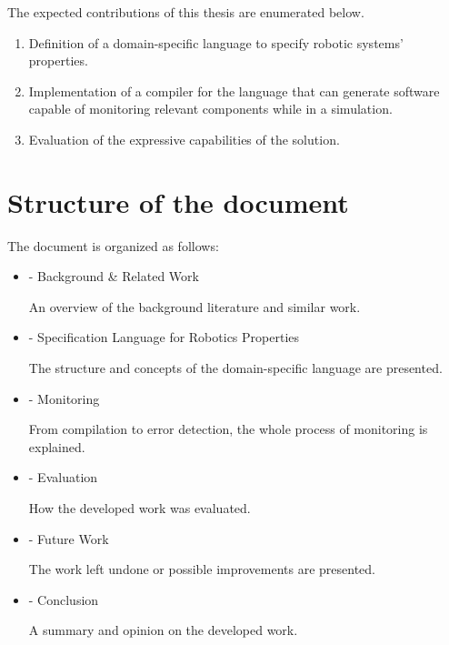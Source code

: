The expected contributions of this thesis are enumerated below.

\begin{enumerate}
    \item Definition of a domain-specific language to specify robotic systems' properties.
    \item Implementation of a compiler for the language that can generate software capable of monitoring relevant components while in a simulation.
    \item Evaluation of the expressive capabilities of the solution.
\end{enumerate}


\section{Structure of the document}
\label{sec:structure}

The document is organized as follows:

\begin{itemize}
    \item {} - Background \& Related Work
    
    An overview of the background literature and similar work.
    
    \item {} - Specification Language for Robotics Properties

    The structure and concepts of the domain-specific language are presented.
    
    \item {} - Monitoring

    From compilation to error detection, the whole process of monitoring is explained.
    
    \item {} - Evaluation 

    How the developed work was evaluated.
    
    \item {} - Future Work

    The work left undone or possible improvements are presented.
    
    \item {} - Conclusion

    A summary and opinion on the developed work.
    
\end{itemize}
